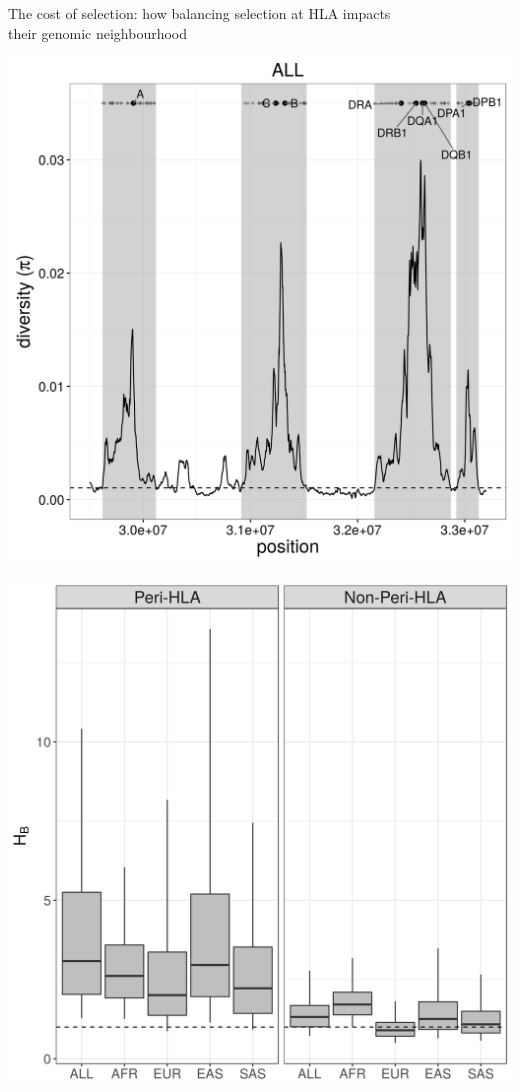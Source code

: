 \documentclass[10pt]{beamer}
\begin{document}
\begin{frame}{\small The cost of selection: how balancing selection at HLA
    impacts  \\ their genomic neighbourhood}
  \centering
  \begin{minipage}{0.35\textwidth}
    \includegraphics[width=\textwidth]{./Figures/htz_ALL.png}
  \end{minipage}
  \begin{minipage}{0.35\textwidth}
    \includegraphics[width=\textwidth]{./Figures/freq_fold_peri.png}

\end{minipage}
\end{frame}
\end{document}
